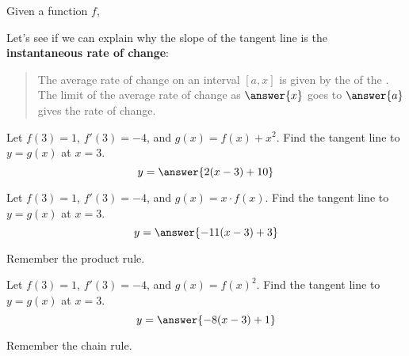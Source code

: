 \documentclass{ximera}
\begin{document}
\begin{problem}
  Given a function $f$, 
  \begin{multipleChoice}
  \end{multipleChoice}
\end{problem}

\begin{problem}
  Let's see if we can explain why the slope of the tangent line is the
  \textbf{instantaneous rate of change}:
  \begin{quote}
    The average rate of change on an interval $[a,x]$ is given by the
     of the
    . The limit of the average rate of
    change as $\answer{x}$ goes to $\answer{a}$ gives the
     rate
    of change.
  \end{quote}
\end{problem}




\begin{problem}
  Let $f(3) = 1$, $f'(3)=-4$, and $g(x) = f(x)+x^2$.
  Find the tangent line to $y= g(x)$ at $x=3$.
  \[
  y= \answer{2(x-3)+10}
  \]
\end{problem}


\begin{problem}
  Let $f(3) = 1$, $f'(3)=-4$, and $g(x) = x\cdot f(x)$.
  Find the tangent line to $y= g(x)$ at $x=3$.
  \[
  y= \answer{-11(x-3)+3}
  \]
  \begin{hint}
    Remember the product rule.
  \end{hint}
\end{problem}

\begin{problem}
  Let $f(3) = 1$, $f'(3)=-4$, and $g(x) = f(x)^2$.
  Find the tangent line to $y= g(x)$ at $x=3$.
  \[
  y= \answer{-8(x-3) + 1}
  \]
  \begin{hint}
    Remember the chain rule.
  \end{hint}
\end{problem}
\end{document}
